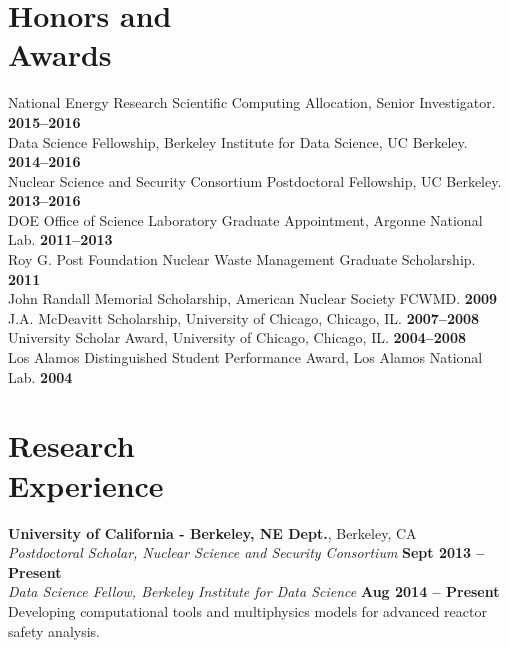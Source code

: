 \documentclass[margin,line]{resume}
\begin{document}
\begin{resume}
    \section{\mysidestyle Honors and\\Awards}
                National Energy Research Scientific Computing Allocation, Senior Investigator.    \hfill \textbf{2015--2016}\vspace{.5mm}\\%
                Data Science Fellowship, Berkeley Institute for Data Science, UC Berkeley.    \hfill \textbf{2014--2016}\vspace{.5mm}\\%
                Nuclear Science and Security Consortium Postdoctoral Fellowship, UC Berkeley. \hfill \textbf{2013--2016}\vspace{.5mm}\\%
		DOE Office of Science Laboratory Graduate Appointment, Argonne National Lab.  \hfill \textbf{2011--2013}\vspace{.5mm}\\%
		Roy G. Post Foundation Nuclear Waste Management Graduate Scholarship.               \hfill \textbf{2011}\vspace{.5mm}\\%
		John Randall Memorial Scholarship, American Nuclear Society FCWMD.                  \hfill \textbf{2009}\vspace{.5mm}\\%
		J.A. McDeavitt Scholarship, University of Chicago, Chicago, IL.                \hfill\textbf{2007--2008}\vspace{.5mm}\\%
		University Scholar Award, University of Chicago, Chicago, IL.                  \hfill\textbf{2004--2008}\vspace{.5mm}\\%
		Los Alamos Distinguished Student Performance Award, Los Alamos National Lab.                        \hfill\textbf{2004}%
    \section{\mysidestyle Research\\Experience}
    \textbf{University of California - Berkeley, NE Dept.}, Berkeley, CA \\
		\textsl{Postdoctoral Scholar, Nuclear Science and Security Consortium} \hfill \textbf{Sept 2013 -- Present}\\
		\textsl{Data Science Fellow, Berkeley Institute for Data Science} \hfill \textbf{Aug 2014 -- Present}\\
                Developing computational tools and multiphysics models for advanced reactor safety analysis.


\end{resume}
\end{document}
